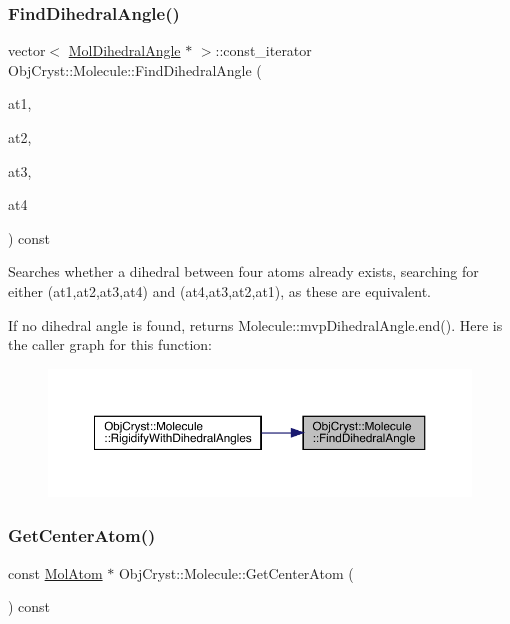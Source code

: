 \subsubsection{\texorpdfstring{FindDihedralAngle()}{FindDihedralAngle()}}
{\footnotesize\ttfamily vector$<$ \mbox{\hyperlink{class_obj_cryst_1_1_mol_dihedral_angle}{Mol\+Dihedral\+Angle}} $\ast$ $>$\+::const\+\_\+iterator Obj\+Cryst\+::\+Molecule\+::\+Find\+Dihedral\+Angle (\begin{DoxyParamCaption}\item[{const \mbox{\hyperlink{class_obj_cryst_1_1_mol_atom}{Mol\+Atom}} \&}]{at1,  }\item[{const \mbox{\hyperlink{class_obj_cryst_1_1_mol_atom}{Mol\+Atom}} \&}]{at2,  }\item[{const \mbox{\hyperlink{class_obj_cryst_1_1_mol_atom}{Mol\+Atom}} \&}]{at3,  }\item[{const \mbox{\hyperlink{class_obj_cryst_1_1_mol_atom}{Mol\+Atom}} \&}]{at4 }\end{DoxyParamCaption}) const}

Searches whether a dihedral between four atoms already exists, searching for either (at1,at2,at3,at4) and (at4,at3,at2,at1), as these are equivalent.

If no dihedral angle is found, returns Molecule\+::mvp\+Dihedral\+Angle.\+end(). Here is the caller graph for this function\+:
\nopagebreak
\begin{figure}[H]
\begin{center}
\leavevmode
\includegraphics[width=350pt]{class_obj_cryst_1_1_molecule_a6bc7da1865f3fd5adc42323fc44d292c_icgraph}
\end{center}
\end{figure}
\mbox{\label{class_obj_cryst_1_1_molecule_a2743c40de811e9b4ba8d5f037632572b}} 
\subsubsection{\texorpdfstring{GetCenterAtom()}{GetCenterAtom()}}
{\footnotesize\ttfamily const \mbox{\hyperlink{class_obj_cryst_1_1_mol_atom}{Mol\+Atom}} $\ast$ Obj\+Cryst\+::\+Molecule\+::\+Get\+Center\+Atom (\begin{DoxyParamCaption}{ }\end{DoxyParamCaption}) const}

